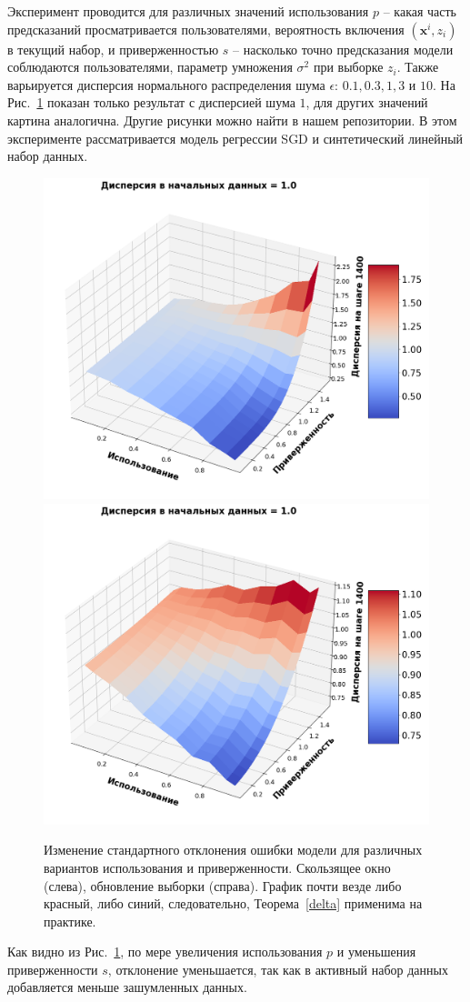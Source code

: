     Эксперимент проводится для различных значений использования $p$ -- какая часть предсказаний просматривается пользователями, вероятность включения $(\mathbf{x}^i, z_i)$ в текущий набор, и приверженностью $s$ -- насколько точно предсказания модели соблюдаются пользователями, параметр умножения $\sigma^2$ при выборке $z_i$. Также варьируется дисперсия нормального распределения шума $\epsilon$: $0.1, 0.3, 1, 3$ и $10$. На Рис.~\ref{3D} показан только результат с дисперсией шума $1$, для других значений картина аналогична. Другие рисунки можно найти в нашем репозитории. В этом эксперименте рассматривается модель регрессии SGD и синтетический линейный набор данных.

    \begin{figure}[h!]
        \centering
        \includegraphics[width=0.49\linewidth]{pictures/3D_sw_1.0_synthetic_sgd_model_50.png}
        \includegraphics[width=0.49\linewidth]{pictures/3D_su_1.0_synthetic_sgd_model_50.png}
        
        \caption{Изменение стандартного отклонения ошибки модели для различных вариантов использования и приверженности. Скользящее окно (слева), обновление выборки (справа). График почти везде либо красный, либо синий, следовательно, Теорема~\ref{delta} применима на практике.}
        \label{3D}
    \end{figure}

    Как видно из Рис.~\ref{3D}, по мере увеличения использования $p$ и уменьшения приверженности $s$, отклонение уменьшается, так как в активный набор данных добавляется меньше зашумленных данных.

